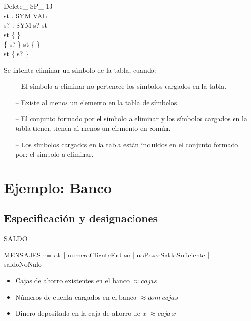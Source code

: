 \begin{schema}{Delete\_ SP\_ 13}\\
 st : SYM \pfun VAL \\
 s? : SYM 
\where
 s? \notin \dom st \\
 st \neq \{ \} \\
 \{ s? \} \cap \dom st \neq \{ \} \\
 \dom st \subset \{ s? \}
\end{schema}

\begin{tcolorbox}[colback=gray!5!white,colframe=gray!50!black,
  colbacktitle=gray!75!black,title=Delete\_ SP\_ 13]
  Se intenta eliminar un símbolo de la tabla, cuando:
     \begin{itemize}
        \item[--]{El símbolo a eliminar no pertenece los símbolos cargados en la tabla.}
        \item[--]{Existe al menos un elemento en la tabla de símbolos.}
        \item[--]{El conjunto formado por el símbolo a eliminar y los símbolos cargados en la tabla tienen tienen al menos un elemento en común.}
        \item[--]{Los símbolos cargados en la tabla están incluidos en el conjunto formado por: el símbolo a eliminar.}
     \end{itemize}
\end{tcolorbox}

\section*{Ejemplo: Banco}

\subsection*{Especificación y designaciones}

\begin{zed}
[NCTA] \also

SALDO == \nat \also

MENSAJES ::= ok | numeroClienteEnUso | noPoseeSaldoSuficiente | saldoNoNulo
\end{zed}

\begin{itemize}
  \item Cajas de ahorro existentes en el banco $\approx cajas$ \\
  \item Números de cuenta cargados en el banco $\approx dom~cajas$ \\
  \item Dinero depositado en la caja de ahorro de $x$ $\approx caja~x$ \\
\end{itemize}

